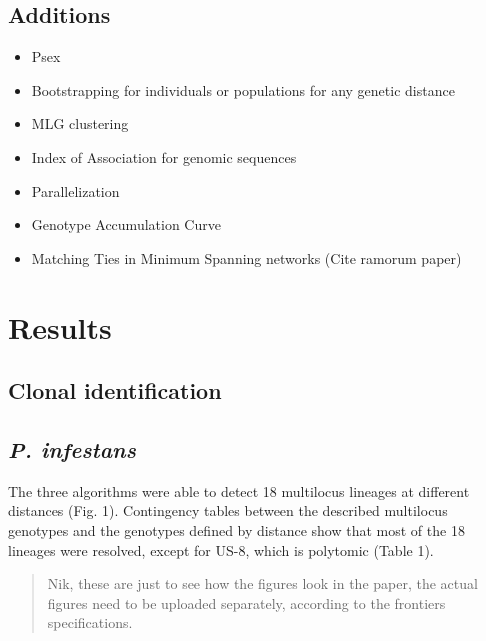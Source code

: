 \documentclass{frontiersSCNS} %
\begin{document}
\subsection*{Additions}\label{additions}

\begin{itemize}
\itemsep1pt\parskip0pt
\item
  Psex
\item
  Bootstrapping for individuals or populations for any genetic distance
\item
  MLG clustering
\item
  Index of Association for genomic sequences
\item
  Parallelization
\item
  Genotype Accumulation Curve
\item
  Matching Ties in Minimum Spanning networks (Cite ramorum paper)
\end{itemize}

\section*{Results}\label{results}

\subsection*{Clonal identification}\label{clonal-identification}

\subsection*{\emph{P. infestans}}\label{p.-infestans-1}

The three algorithms were able to detect 18 multilocus lineages at
different distances (Fig. 1). Contingency tables between the described
multilocus genotypes and the genotypes defined by distance show that
most of the 18 lineages were resolved, except for US-8, which is
polytomic (Table 1).

\begin{quote}
Nik, these are just to see how the figures look in the paper, the actual
figures need to be uploaded separately, according to the frontiers
specifications.
\end{quote}
\end{document}
